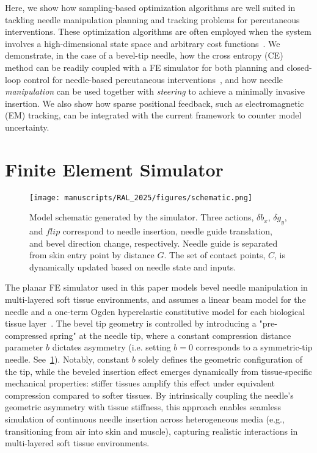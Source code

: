 Here, we show how sampling-based optimization algorithms are well suited in tackling needle manipulation planning and tracking problems for percutaneous interventions. These optimization algorithms are often employed when the system involves a high-dimensional state space and arbitrary cost functions~\parencite{kobilarovCrossEntropyMotionPlanning2012,petrovicCrossEntropyBasedStochastic2020,taoPathPlanningUncertain2022,suhFastSamplingBasedCostAware2017}. We demonstrate, in the case of a bevel-tip needle, how the cross entropy (CE) method can be readily coupled with a FE simulator for both planning and closed-loop control for needle-based percutaneous interventions~\parencite{wangBevelTipNeedleDeflection2024}, and how needle \textit{manipulation} can be used together with \textit{steering} to achieve a minimally invasive insertion. We also show how sparse positional feedback, such as electromagnetic (EM) tracking, can be integrated with the current framework to counter model uncertainty.

\section{Finite Element Simulator}
\label{sec:chap-5-fe-simulator}

\begin{figure}[h]
  \centering
  \texttt{[image: manuscripts/RAL\_2025/figures/schematic.png]}
  \caption{Model schematic generated by the simulator. Three actions, $\delta b_x$, $\delta g_y$, and $flip$ correspond to needle insertion, needle guide translation, and bevel direction change, respectively. Needle guide is separated from skin entry point by distance $G$. The set of contact points, $C$, is dynamically updated based on needle state and inputs.}
  \label{fig:chap-5-simulator}
\end{figure}

The planar FE simulator used in this paper models bevel needle manipulation in multi-layered soft tissue environments, and assumes a linear beam model for the needle and a one-term Ogden hyperelastic constitutive model for each biological tissue layer~\parencite{wangFlexibleNeedleBending2023,wangBevelTipNeedleDeflection2024}. The bevel tip geometry is controlled by introducing a "pre-compressed spring" at the needle tip, where a constant compression distance parameter $b$ dictates asymmetry (i.e. setting $b = 0$ corresponds to a symmetric-tip needle. See~\cref{fig:chap-5-simulator}). Notably, constant $b$ solely defines the geometric configuration of the tip, while the beveled insertion effect emerges dynamically from tissue-specific mechanical properties: stiffer tissues amplify this effect under equivalent compression compared to softer tissues. By intrinsically coupling the needle’s geometric asymmetry with tissue stiffness, this approach enables seamless simulation of continuous needle insertion across heterogeneous media (e.g., transitioning from air into skin and muscle), capturing realistic interactions in multi-layered soft tissue environments.

